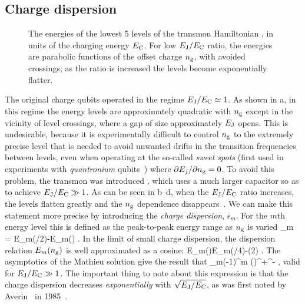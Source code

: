 \subsection{Charge dispersion}
\begin{figure}
 \centering
 \caption[Charge dispersion]{ The energies of the lowest 5 levels of the transmon Hamiltonian , in units of the charging energy $E_{\text{C}}$. For low $E_{\text{J}}/E_{\text{C}}$ ratio, the energies are parabolic functions of the offset charge $n_{\text{g}}$, with avoided crossings; as the ratio is increased the levels become exponentially flatter.\label{fig:dispersion}}
\end{figure}%
The original charge qubits \cite{nakamura_coherent_1999,bouchiat_quantum_1998} operated in the regime $E_{\text{J}}/E_{\text{C}}\simeq1$. As shown in a, in this regime the energy levels are approximately quadratic with $n_{\text{g}}$ except in the vicinity of level crossings, where a gap of size approximately $E_{\text{J}}$ opens. This is undesirable, because it is experimentally difficult to control $n_{\text{g}}$ to the extremely precise level that is needed to avoid unwanted drifts in the transition frequencies between levels, even when operating at the so-called \emph{sweet spots} (first used in experiments with \emph{quantronium} qubits~\cite{vion_manipulatingquantum_2002}) where $\partial E_j/\partial n_{\text{g}}=0$. To avoid this problem, the transmon was introduced \cite{koch_charge-insensitive_2007}, which uses a much larger capacitor so as to achieve $E_{\text{J}}/E_{\text{C}}\gg 1$. As can be seen in b--d, when the $E_{\text{J}}/E_{\text{C}}$ ratio increases, the levels flatten greatly and the $n_{\text{g}}$ dependence disappears~\cite{cottetthesis}. We can make this statement more precise by introducing the \emph{charge dispersion}, $\epsilon_m$. For the $m$th energy level this is defined as the peak-to-peak energy range as $n_{\text{g}}$ is varied
\be
    \epsilon_m = E_m(/2)-E_m() .
\ee
In the limit of small charge dispersion, the dispersion relation $E_m(n_{\text{g}})$ is well approximated as a cosine:
\be
    \label{eq:cosdisp}
    E_m(\ngate)\simeq E_m(/4)-\cos(2\pi\ngate) .
\ee%
%
The asymptotics of the Mathieu solution  give the result that
\be
    \label{eq:expsupp}
    \epsilon_m\simeq(-1)^m\EC{}
        {\left(\frac{\EJ}{2\EC}\right)}^{+}\rme^{-\sqrt{\smash[b]{8\EJ/\EC}}} ,
\ee
valid for $E_{\text{J}}/E_{\text{C}}\gg 1$. The important thing to note about this expression is that the charge dispersion decreases \emph{exponentially} with $\sqrt{\smash[b]{E_{\text{J}}/E_{\text{C}}}}$, as was first noted by Averin \etal\ in 1985~\cite{averin_likharev_zorin}.

